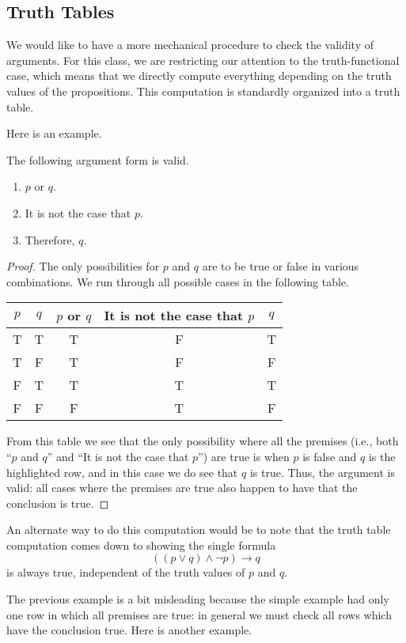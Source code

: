 \subsection{Truth Tables}
We would like to have a more mechanical procedure to check the validity of arguments. For this class, we are restricting our attention to the truth-functional case, which means that we directly compute everything depending on the truth values of the propositions. This computation is standardly organized into a truth table.

Here is an example.
\begin{exe}
	The following argument form is valid.
	\begin{enumerate}
		\item $p$ or $q$.
		\item It is not the case that $p$.
		\item Therefore, $q$.
	\end{enumerate}
\end{exe}
\begin{proof}
	The only possibilities for $p$ and $q$ are to be true or false in various combinations. We run through all possible cases in the following table.
	\begin{center}
		\begin{tabular}{c|c||c|c|c}
			$p$ & $q$ & $p$ or $q$ & It is not the case that $p$ & $q$ \\\hline
			T & T & T & F & T \\
			T & F & T & F & F \\
			\color{red}F & \color{red}T & \color{red}T & \color{red}T & \color{red}T \\
			F & F & F & T & F
		\end{tabular}
	\end{center}
	From this table we see that the only possibility where all the premises (i.e., both ``$p$ and $q$'' and ``It is not the case that $p$'') are true is when $p$ is false and $q$ is the highlighted row, and in this case we do see that $q$ is true. Thus, the argument is valid: all cases where the premises are true also happen to have that the conclusion is true.
\end{proof}
\begin{remark}
	An alternate way to do this computation would be to note that the truth table computation comes down to showing the single formula
	\[((p\lor q)\land\lnot p)\to q\]
	is always true, independent of the truth values of $p$ and $q$.
\end{remark}
The previous example is a bit misleading because the simple example had only one row in which all premises are true: in general we must check all rows which have the conclusion true. Here is another example.
